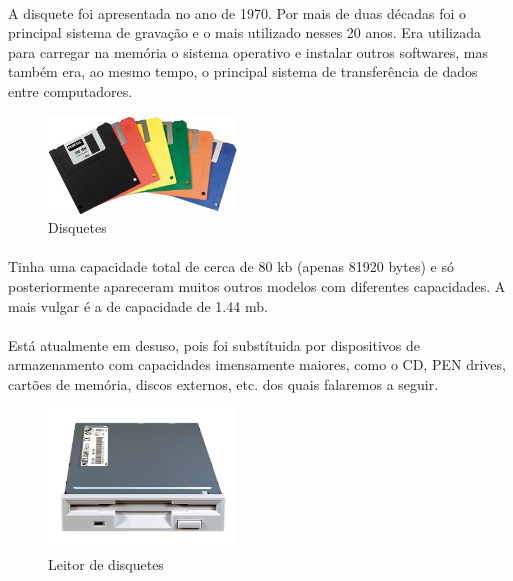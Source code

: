 \documentclass[a4paper]{report}
\begin{document}
\paragraph*{}A disquete foi apresentada no ano de 1970. Por mais de duas décadas foi o principal sistema de gravação e o mais utilizado nesses 20 anos. Era utilizada para carregar na memória o sistema operativo e instalar outros softwares, mas também era, ao mesmo tempo, o principal sistema de transferência de dados entre computadores.

\begin{figure}[H]
\center
\includegraphics[width=5cm]{Imagens/disquetes.jpg}
\caption{Disquetes}
\end{figure}

\paragraph*{}Tinha uma capacidade total de cerca de 80 \ac{kb} (apenas 81920 bytes) e só posteriormente apareceram muitos outros modelos com diferentes capacidades. A mais vulgar é a de capacidade de 1.44 \ac{mb}. 

\paragraph*{}Está atualmente em desuso, pois foi substítuida por dispositivos de  armazenamento com capacidades imensamente maiores, como o CD, PEN drives, cartões de memória, discos externos, etc. dos quais falaremos a seguir.

\begin{figure}[H]
\center
\includegraphics[width=5cm]{Imagens/leitor_disquete.jpg}
\caption{Leitor de disquetes}
\end{figure}

\newpage
\end{document}
